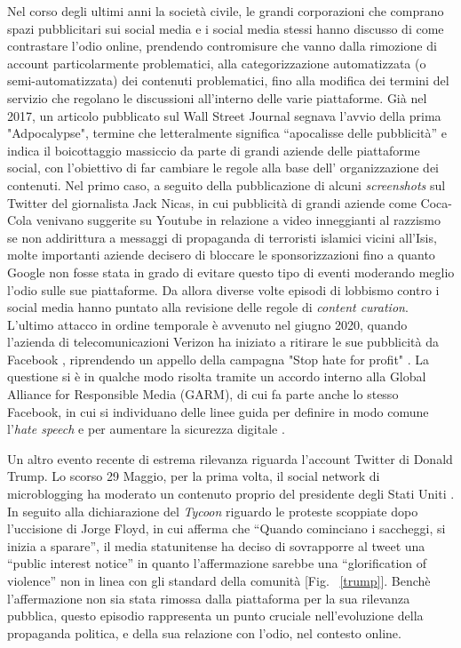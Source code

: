 Nel corso degli ultimi anni la società civile, le grandi corporazioni che comprano spazi pubblicitari sui social media e i social media stessi hanno discusso di come contrastare l'odio online, prendendo contromisure che vanno dalla rimozione di account particolarmente problematici, alla categorizzazione automatizzata (o semi-automatizzata) dei contenuti problematici, fino alla modifica dei termini del servizio che regolano le discussioni all'interno delle varie piattaforme.
Già nel 2017, un articolo pubblicato sul Wall Street Journal \citep{nicas2017} segnava l'avvio della prima "Adpocalypse", termine che letteralmente significa “apocalisse delle pubblicità” e indica il  boicottaggio massiccio da parte di grandi aziende delle piattaforme social, con l'obiettivo di far cambiare le regole alla base dell' organizzazione dei contenuti.  Nel primo caso, a seguito della pubblicazione di alcuni \textit{screenshots} sul Twitter del giornalista Jack Nicas, in cui pubblicità di grandi aziende come Coca-Cola venivano suggerite su Youtube in relazione a video inneggianti al razzismo se non addirittura a messaggi di propaganda di terroristi islamici vicini all'Isis, molte importanti aziende decisero di bloccare le sponsorizzazioni fino a quanto Google non fosse stata in grado di evitare questo tipo di eventi moderando meglio l'odio sulle sue piattaforme.  Da allora diverse volte episodi di lobbismo contro i social media hanno puntato alla revisione delle regole di \textit{content curation}. L'ultimo attacco in ordine temporale è avvenuto nel giugno 2020, quando l'azienda di telecomunicazioni Verizon ha iniziato a ritirare le sue pubblicità da Facebook \citep{Kari2020}, riprendendo un appello della campagna "Stop hate for profit" \citep{stophate2020}. La questione si è in qualche modo risolta tramite un accordo interno alla Global Alliance for Responsible Media (GARM), di cui fa parte anche lo stesso Facebook, in cui si individuano delle linee guida per definire in modo comune l'\textit{hate speech} e per aumentare la sicurezza digitale \citep{wfa2019}.


Un altro evento recente di estrema rilevanza riguarda l'account Twitter di Donald Trump. Lo scorso 29 Maggio, per la prima volta, il social network di microblogging ha moderato un contenuto proprio del presidente degli Stati Uniti \citep{tacopino2020}.  In seguito alla dichiarazione del \textit{Tycoon} riguardo le proteste scoppiate dopo l'uccisione di Jorge Floyd, in cui afferma che “Quando cominciano i saccheggi, si inizia a sparare”, il media statunitense ha deciso di sovrapporre al tweet una “public interest notice” in quanto l'affermazione sarebbe una “glorification of violence” non in linea con gli standard della comunità [Fig. ~\ref{trump}]. Benchè l'affermazione non sia stata rimossa dalla piattaforma per la sua rilevanza pubblica, questo episodio rappresenta un punto cruciale nell'evoluzione della propaganda politica, e della sua relazione con l'odio, nel contesto online.

